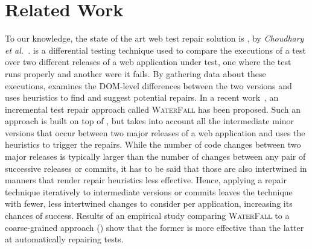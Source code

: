 \section{Related Work}\label{sec:relwork}

 To our knowledge, the state of the art web test repair solution is \water, by \textit{Choudhary et al.}~\cite{Choudhary:2011:WWA:2002931.2002935}. \water is a differential testing technique used to compare the executions of a test over two different releases of a web application under test, one where the test runs properly and another were it fails. By gathering data about these executions, \water examines the DOM-level differences between the two versions and uses heuristics to find and suggest potential repairs.
%
In a recent work~\cite{Hammoudi-2016-FSE}, an incremental test repair approach called \textsc{WaterFall} has been proposed. 
Such an approach is built on top of \water, but takes into account all the intermediate minor versions that occur between two major releases of a web application and uses the \water heuristics to trigger the repairs. While the number of code changes between two major releases is typically larger than the number of changes between any pair of successive releases or commits, it has to be said that those are also intertwined in manners that render repair heuristics less effective. Hence, applying a repair technique iteratively to intermediate versions or commits leaves the technique with fewer, less intertwined changes to consider per application, increasing its chances of success.
Results of an empirical study comparing \textsc{WaterFall} to a coarse-grained approach (\water) show that the former is more effective than the latter at automatically repairing tests.

